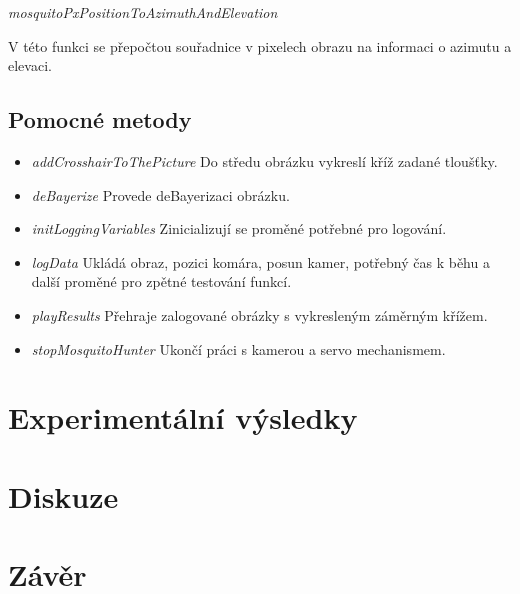 \documentclass[a4paper,10pt]{article}
\begin{document}

\vspace{0.5cm}
\textit{mosquitoPxPositionToAzimuthAndElevation}

V této funkci se přepočtou souřadnice v pixelech obrazu na informaci o azimutu a elevaci.


\subsection{Pomocné metody}

\begin{itemize}
 \item \textit{addCrosshairToThePicture} Do středu obrázku vykreslí kříž zadané tloušťky. 
 \item \textit{deBayerize} Provede deBayerizaci obrázku.
\item \textit{initLoggingVariables} Zinicializují se proměné potřebné pro logování.
 \item \textit{logData} Ukládá obraz, pozici komára, posun kamer, potřebný čas k běhu a další proměné pro zpětné testování funkcí.
\item \textit{playResults} Přehraje zalogované obrázky s vykresleným záměrným křížem.
\item \textit{stopMosquitoHunter} Ukončí práci s kamerou a servo mechanismem.

\end{itemize}

\section{Experimentální výsledky}


\section{Diskuze}
\section{Závěr}



\end{document}
